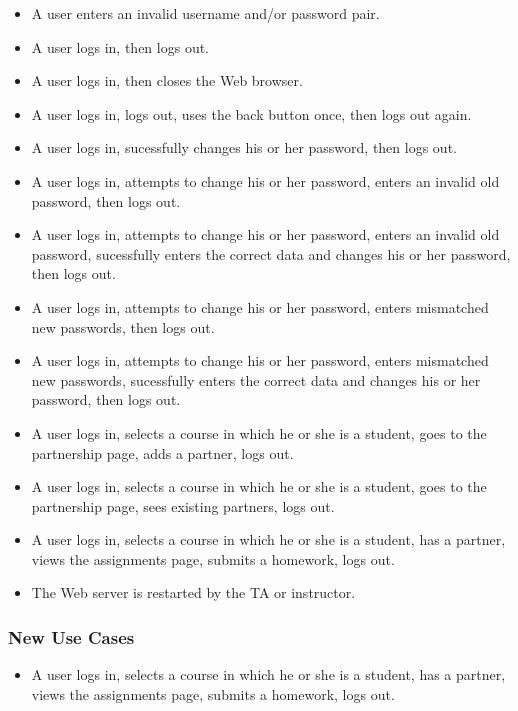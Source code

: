 \documentclass[a4paper]{article}
\begin{document}
\begin{itemize}
\item{A user enters an invalid username and/or password pair.}
\item{A user logs in, then logs out.}
\item{A user logs in, then closes the Web browser.}
\item{A user logs in, logs out, uses the back button once, then logs out again.}
\item{A user logs in, sucessfully changes his or her password, then logs out.}
\item{A user logs in, attempts to change his or her password, enters an invalid
old password, then logs out.}
\item{A user logs in, attempts to change his or her password, enters an invalid
old password, sucessfully enters the correct data and changes his or her password,
then logs out.}
\item{A user logs in, attempts to change his or her password, enters mismatched
new passwords, then logs out.}
\item{A user logs in, attempts to change his or her password, enters mismatched
new passwords, sucessfully enters the correct data and changes his or her password,
then logs out.}
\item{A user logs in, selects a course in which he or she is a student, goes to
  the partnership page, adds a partner, logs out.}
\item{A user logs in, selects a course in which he or she is a student, goes to
  the partnership page, sees existing partners, logs out.}
\item{A user logs in, selects a course in which he or she is a student, has a
  partner, views the assignments page, submits a homework, logs out.}
\item{The Web server is restarted by the TA or instructor.}
\end{itemize}

\subsubsection{New Use Cases}\label{subsubsec:newusecases}
\begin{itemize}
\item{A user logs in, selects a course in which he or she is a student, has a
  partner, views the assignments page, submits a homework, logs out.}
\end{itemize}
\end{document}
